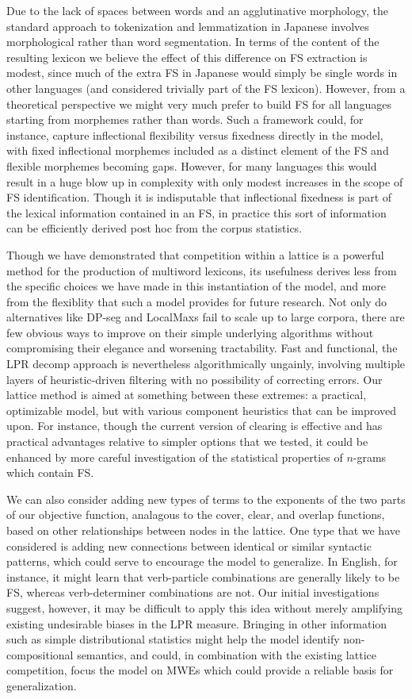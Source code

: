 \documentclass[11pt,letterpaper]{article}
\begin{document}
Due to the lack of spaces between words and an agglutinative morphology, the standard approach to tokenization and lemmatization in Japanese involves morphological rather than word segmentation. In terms of the content of the resulting lexicon we believe the effect of this difference on FS extraction is modest, since much of the extra FS in Japanese would simply be single words in other languages (and considered trivially part of the FS lexicon). However, from a theoretical perspective we might very much prefer to build FS for all languages starting from morphemes rather than words. Such a framework could, for instance, capture inflectional flexibility versus fixedness directly in the model, with fixed inflectional morphemes included as a distinct element of the FS and flexible morphemes becoming gaps. However, for many languages this would result in a huge blow up in complexity with only modest increases in the scope of FS identification. Though it is indisputable that inflectional fixedness is part of the lexical information contained in an FS, in practice this sort of information can be efficiently derived post hoc from the corpus statistics.

Though we have demonstrated that competition within a lattice is a powerful method for the production of multiword lexicons, its usefulness derives less from the specific choices we have made in this instantiation of the model, and more from the flexiblity that such a model provides for future research. Not only do alternatives like DP-seg and LocalMaxs fail to scale up to large corpora, there are few obvious ways to improve on their simple underlying algorithms without compromising their elegance and worsening tractability. Fast and functional, the LPR decomp approach is nevertheless algorithmically ungainly, involving multiple layers of heuristic-driven filtering with no possibility of correcting errors. Our lattice method is aimed at something between these extremes: a practical, optimizable model, but with various component heuristics that can be improved upon. For instance, though the current version of clearing is effective and has practical advantages relative to simpler options that we tested, it could be enhanced by more careful investigation of the statistical properties of $n$-grams which contain FS.

We can also consider adding new types of terms to the exponents of the two parts of our objective function, analagous to the cover, clear, and overlap functions, based on other relationships between nodes in the lattice. One type that we have considered is adding new connections between identical or similar syntactic patterns, which could serve to encourage the model to generalize. In English, for instance, it might learn that verb-particle combinations are generally likely to be FS, whereas verb-determiner combinations are not. Our initial investigations suggest, however, it may be difficult to apply this idea without merely amplifying existing undesirable biases in the LPR measure. Bringing in other information such as simple distributional statistics might help the model identify non-compositional semantics, and could, in combination with the existing lattice competition, focus the model on MWEs which could provide a reliable basis for generalization.
\end{document}
